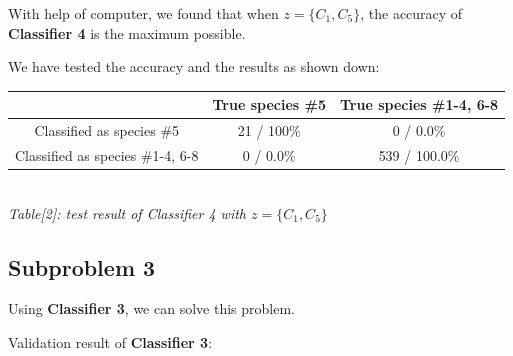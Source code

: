 \documentclass[12pt]{article}
\begin{document}
			With help of computer, we found that when $z=\{C_1, C_5\}$, the accuracy of
			\textbf{Classifier 4} is the maximum possible.
			
			We have tested the accuracy and the results as shown down:
				
			\begin{center}
				\begin{tabular}{| c | c | c |}
				\hline
				& True species \#5 & True species \#1-4, 6-8 \\
				\hline
				Classified as species \#5 & 21 / 100\% & 0 / 0.0\% \\
				\hline
				Classified as species \#1-4, 6-8 & 0 / 0.0\% & 539 / 100.0\% \\
				\hline
				\end{tabular} \\
				\vspace{3mm}
				\textit{Table[2]: test result of Classifier 4 with $z=\{C_1, C_5\}$}
			\end{center}
		
		\newpage
		\subsection{Subproblem 3}
			
			Using \textbf{Classifier 3}, we can solve this problem.
			
			Validation result of \textbf{Classifier 3}:
			
\end{document}
